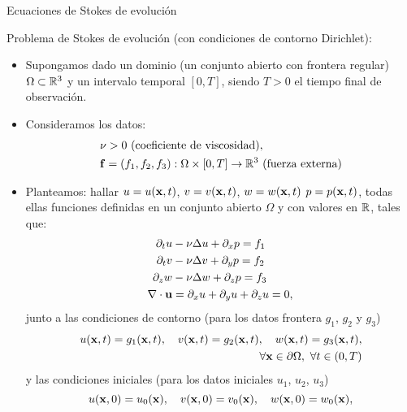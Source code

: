 \documentclass[8pt]{beamer}
\begin{document}
\begin{frame}{Ecuaciones de Stokes de evolución}

  \alert{Problema de Stokes de evolución} (con condiciones de contorno \alert{Dirichlet}):

  \begin{itemize}
  \item Supongamos dado un dominio (un conjunto abierto con frontera
    regular) $\Omega\subset {\mathbb R}^3$ y un intervalo temporal $[0,T]$,
    siendo $T>0$ el tiempo final de observación.
  \item Consideramos los datos:
    \begin{align}
      &\nu>0 \ \text{(coeficiente de viscosidad)},\\
      &\ff=(f_1,f_2,f_3):\Omega\times [0,T] \to \Rset^3 \ \text{(fuerza externa)}
    \end{align}

  \item Planteamos: hallar $u=u(\mathbf{x},t)$, $v=v(\mathbf{x},t)$, $w=w(\mathbf{x},t)$
    $p=p(\mathbf{x},t)$, todas ellas funciones definidas en un conjunto
    abierto $\Omega$ y con valores en ${\mathbb R}$, tales que:
    \begin{align}
      \partial_t u &- \nu\Delta u + \partial_x p = f_1
      \\
      \partial_t v &- \nu\Delta v + \partial_y p = f_2
      \\
      \partial_z w &- \nu\Delta w + \partial_z p = f_3
      \\
      \nabla\cdot{}\mathbf{u} &= \partial_x u + \partial_y u + \partial_z u = 0,
    \end{align}
    junto a las condiciones de contorno (para los datos frontera $g_1$, $g_2$ y $g_3$)
    \begin{align}
      u(\mathbf{x},t)=g_1(\mathbf{x},t),
      \quad
      v(\mathbf{x},t)=g_2(\mathbf{x},t),
      \quad
      w(\mathbf{x},t)=g_3(\mathbf{x},t),
      \\
    \forall \mathbf{x}\in\partial\Omega, \ \forall t\in(0,T)
    \end{align}
    y las condiciones iniciales (para los datos iniciales $u_1$, $u_2$, $u_3$)
    $$
    u(\mathbf{x},0) = u_0(\mathbf{x}), \quad v(\mathbf{x},0)=v_0(\mathbf{x}), \quad w(\mathbf{x},0)=w_0(\mathbf{x}),
    $$
  \end{itemize}

\end{frame}
\end{document}
